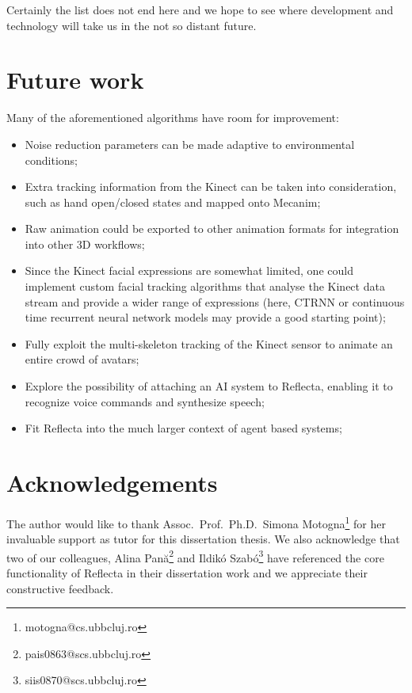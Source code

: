 \documentclass[a4paper, 12pt]{amsart}
\begin{document}
Certainly the list does not end here and we hope to see where development and technology will take us in the not so distant future.

\clearpage

\section{Future work}

Many of the aforementioned algorithms have room for improvement:

\begin{itemize}
\item Noise reduction parameters can be made adaptive to environmental conditions;
\item Extra tracking information from the Kinect can be taken into consideration, such as hand open/closed states and mapped onto Mecanim;
\item Raw animation could be exported to other animation formats for integration into other 3D workflows;
\item Since the Kinect facial expressions are somewhat limited, one could implement custom facial tracking algorithms that analyse the Kinect data stream and provide a wider range of expressions (here, CTRNN or continuous time recurrent neural network models may provide a good starting point);
\item Fully exploit the multi-skeleton tracking of the Kinect sensor to animate an entire crowd of avatars;
\item Explore the possibility of attaching an AI system to Reflecta, enabling it to recognize voice commands and synthesize speech;
\item Fit Reflecta into the much larger context of agent based systems;
\end{itemize}

\clearpage

\section{Acknowledgements}

The author would like to thank Assoc.\ Prof.\ Ph.D.\ Simona Motogna\footnote{motogna@cs.ubbcluj.ro} for her invaluable support as tutor for this dissertation thesis. We also acknowledge that two of our colleagues, Alina Pan\u{a}\footnote{pais0863@scs.ubbcluj.ro} and Ildik\'{o} Szab\'{o}\footnote{siis0870@scs.ubbcluj.ro} have referenced the core functionality of Reflecta in their dissertation work and we appreciate their constructive feedback.
\end{document}
